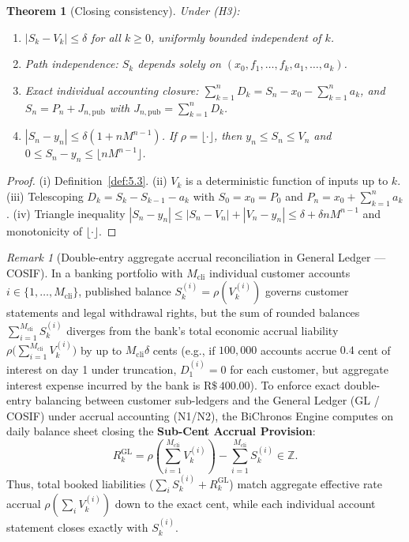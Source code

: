 \documentclass[11pt, a4paper]{article}
\theoremstyle{definition}
\theoremstyle{plain}
\newtheorem{teorema}[definicao]{Theorem}
\theoremstyle{remark}
\newtheorem{observacao}[definicao]{Remark}
\begin{document}
\begin{teorema}[Closing consistency]\label{teo:5.8}
Under (H3):
\begin{enumerate}[label=(\roman*)]
    \item $|S_k - V_k| \le \delta$ for all $k \ge 0$, uniformly bounded independent of $k$.
    \item Path independence: $S_k$ depends solely on $(x_0, f_1, \dots, f_k, a_1, \dots, a_k)$.
    \item Exact individual accounting closure: $\sum_{k=1}^{n} D_k = S_n - x_0 - \sum_{k=1}^{n} a_k$, and $S_n = P_n + J_{n,\text{pub}}$ with $J_{n,\text{pub}} = \sum_{k=1}^n D_k$.
    \item $|S_n - y_n| \le \delta(1 + n M^{n-1})$. If $\rho = \lfloor \cdot \rfloor$, then $y_n \le S_n \le V_n$ and $0 \le S_n - y_n \le \lfloor n M^{n-1} \rfloor$.
\end{enumerate}
\end{teorema}
\begin{proof}
(i) Definition~\ref{def:5.3}. (ii) $V_k$ is a deterministic function of inputs up to $k$. (iii) Telescoping $D_k = S_k - S_{k-1} - a_k$ with $S_0 = x_0 = P_0$ and $P_n = x_0 + \sum_{k=1}^n a_k$. (iv) Triangle inequality $|S_n - y_n| \le |S_n - V_n| + |V_n - y_n| \le \delta + \delta n M^{n-1}$ and monotonicity of $\lfloor \cdot \rfloor$.
\end{proof}

\begin{observacao}[Double-entry aggregate accrual reconciliation in General Ledger --- COSIF]\label{obs:5.9}
In a banking portfolio with $M_{\text{cli}}$ individual customer accounts $i \in \{1, \dots, M_{\text{cli}}\}$, published balance $S_k^{(i)} = \rho(V_k^{(i)})$ governs customer statements and legal withdrawal rights, but the sum of rounded balances $\sum_{i=1}^{M_{\text{cli}}} S_k^{(i)}$ diverges from the bank's total economic accrual liability $\rho\big(\sum_{i=1}^{M_{\text{cli}}} V_k^{(i)}\big)$ by up to $M_{\text{cli}}\delta$ cents (e.g., if $100,000$ accounts accrue $0.4$ cent of interest on day 1 under truncation, $D_1^{(i)} = 0$ for each customer, but aggregate interest expense incurred by the bank is $\text{R\$}\,400.00$). To enforce exact double-entry balancing between customer sub-ledgers and the General Ledger (GL / COSIF) under accrual accounting (N1/N2), the BiChronos Engine computes on daily balance sheet closing the \textbf{Sub-Cent Accrual Provision}:
\[
R_k^{\text{GL}} = \rho\left(\sum_{i=1}^{M_{\text{cli}}} V_k^{(i)}\right) - \sum_{i=1}^{M_{\text{cli}}} S_k^{(i)} \in \mathbb{Z}.
\]
Thus, total booked liabilities ($\sum_i S_k^{(i)} + R_k^{\text{GL}}$) match aggregate effective rate accrual $\rho(\sum_i V_k^{(i)})$ down to the exact cent, while each individual account statement closes exactly with $S_k^{(i)}$.
\end{observacao}
\end{document}
